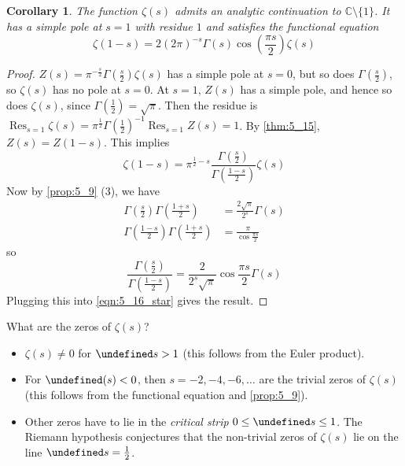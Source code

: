 \documentclass[11pt]{article}
\theoremstyle{definition}
\theoremstyle{plain}
\newtheorem{corollary}[definition]{Corollary}
\theoremstyle{remark}
\let\Re\undefined
\DeclareMathOperator{\Re}{Re}
\DeclareMathOperator{\Res}{Res}
\newcommand{\CC}{\mathbb{C}}
\begin{document}
\begin{corollary}\label{cor:5_16}
    The function $\zeta(s)$ admits an analytic continuation to $\CC \setminus \{1\}$. It has a simple pole at $s=1$ with residue $1$ and satisfies the functional equation
    \begin{equation*}
        \zeta(1-s) = 2 (2 \pi)^{-s} \Gamma(s) \cos\left(\frac{\pi s}{2}\right) \zeta(s)
    \end{equation*}
\end{corollary}
\begin{proof}
    $Z(s) = \pi^{-\frac{s}{2}} \Gamma\left(\frac{s}{2}\right) \zeta(s)$ has a simple pole at $s=0$, but so does $\Gamma\left(\frac{s}{2}\right)$, so $\zeta(s)$ has no pole at $s=0$. At $s=1$, $Z(s)$ has a simple pole, and hence so does $\zeta(s)$, since $\Gamma\left(\frac{1}{2}\right) = \sqrt{\pi}$. Then the residue is $\Res_{s=1} \zeta(s) = \pi^{\frac{1}{2}} \Gamma\left(\frac{1}{2}\right)^{-1} \Res_{s=1} Z(s) = 1$. By \autoref{thm:5_15}, $Z(s) = Z(1-s)$. This implies
    \begin{equation}\label{eqn:5_16_star}
        \zeta(1-s) = \pi^{\frac{1}{2} - s} \frac{\Gamma\left(\frac{s}{2}\right)}{\Gamma\left(\frac{1-s}{2}\right)} \zeta(s)
    \end{equation}
    Now by \autoref{prop:5_9} (3), we have
    \begin{align*}
        \Gamma\left(\frac{s}{2}\right) \Gamma\left(\frac{1+s}{2}\right) &= \frac{2 \sqrt{\pi}}{2^s} \Gamma(s)\\
        \Gamma\left(\frac{1-s}{2}\right) \Gamma\left(\frac{1+s}{2}\right) &= \frac{\pi}{\cos \frac{\pi s}{2}}
    \end{align*}
    so
    \begin{equation*}
        \frac{\Gamma(\frac{s}{2})}{\Gamma(\frac{1-s}{2})} = \frac{2}{2^s \sqrt{\pi}} \cos{\frac{\pi s}{2}} \Gamma(s)
    \end{equation*}
    Plugging this into \eqref{eqn:5_16_star} gives the result.
\end{proof}

\noindent What are the zeros of $\zeta(s)$?
\begin{itemize}
    \item $\zeta(s) \neq 0$ for $\Re s > 1$ (this follows from the Euler product).
    \item For $\Re(s) < 0$, then $s = -2, -4, -6, \ldots$ are the trivial zeros of $\zeta(s)$ (this follows from the functional equation and \autoref{prop:5_9}).
    \item Other zeros have to lie in the \emph{critical strip} $0 \le \Re s \le 1$. The Riemann hypothesis conjectures that the non-trivial zeros of $\zeta(s)$ lie on the line $\Re s = \frac{1}{2}$.
\end{itemize}
\end{document}

